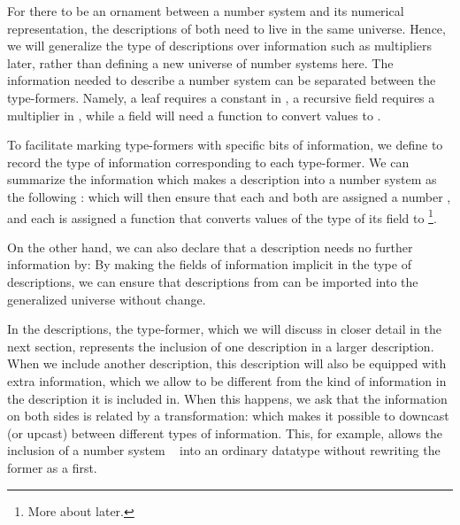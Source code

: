 For there to be an ornament between a number system and its numerical representation, the descriptions of both need to live in the same universe. Hence, we will generalize the type of descriptions over information such as multipliers later, rather than defining a new universe of number systems here. The information needed to describe a number system can be separated between the type-formers. Namely, a leaf  requires a constant in \bN{}, a recursive field  requires a multiplier in \bN{}, while a field  will need a function to convert values to \bN{}.

To facilitate marking type-formers with specific bits of information, we define 
to record the type of information corresponding to each type-former. We can summarize the information which makes a description into a number system as the following :
which will then ensure that each  and  both are assigned a number \bN{}, and each  is assigned a function that converts values of the type of its field to \bN{}\footnote{More about  later.}.

On the other hand, we can also declare that a description needs no further information by:
By making the fields of information implicit in the type of descriptions, we can ensure that descriptions from  can be imported into the generalized universe without change.


In the descriptions, the  type-former, which we will discuss in closer detail in the next section, represents the inclusion of one description in a larger description. When we include another description, this description will also be equipped with extra information, which we allow to be different from the kind of information in the description it is included in. When this happens, we ask that the information on both sides is related by a transformation:
which makes it possible to downcast (or upcast) between different types of information. This, for example, allows the inclusion of a number system \  into an ordinary datatype  without rewriting the former as a  first.


